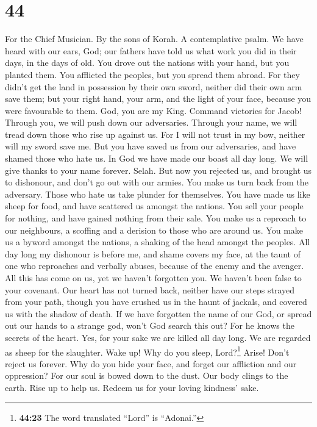 \hypertarget{section-43}{%
\section{44}\label{section-43}}

For the Chief Musician. By the sons of Korah. A contemplative psalm.
 We have heard with our ears, God; our fathers have told
us what work you did in their days, in the days of old. 
You drove out the nations with your hand, but you planted them. You
afflicted the peoples, but you spread them abroad.  For
they didn't get the land in possession by their own sword, neither did
their own arm save them; but your right hand, your arm, and the light of
your face, because you were favourable to them.  God, you
are my King. Command victories for Jacob!  Through you, we
will push down our adversaries. Through your name, we will tread down
those who rise up against us.  For I will not trust in my
bow, neither will my sword save me.  But you have saved us
from our adversaries, and have shamed those who hate us. 
In God we have made our boast all day long. We will give thanks to your
name forever. Selah.  But now you rejected us, and brought
us to dishonour, and don't go out with our armies.  You
make us turn back from the adversary. Those who hate us take plunder for
themselves.  You have made us like sheep for food, and
have scattered us amongst the nations.  You sell your
people for nothing, and have gained nothing from their sale.
 You make us a reproach to our neighbours, a scoffing and
a derision to those who are around us.  You make us a
byword amongst the nations, a shaking of the head amongst the peoples.
 All day long my dishonour is before me, and shame covers
my face,  at the taunt of one who reproaches and verbally
abuses, because of the enemy and the avenger.  All this
has come on us, yet we haven't forgotten you. We haven't been false to
your covenant.  Our heart has not turned back, neither
have our steps strayed from your path,  though you have
crushed us in the haunt of jackals, and covered us with the shadow of
death.  If we have forgotten the name of our God, or
spread out our hands to a strange god,  won't God search
this out? For he knows the secrets of the heart.  Yes,
for your sake we are killed all day long. We are regarded as sheep for
the slaughter.  Wake up! Why do you sleep,
Lord?\footnote{\textbf{44:23} The word translated ``Lord'' is
  ``Adonai.''} Arise! Don't reject us forever.  Why do
you hide your face, and forget our affliction and our oppression?
 For our soul is bowed down to the dust. Our body clings
to the earth.  Rise up to help us. Redeem us for your
loving kindness' sake.

